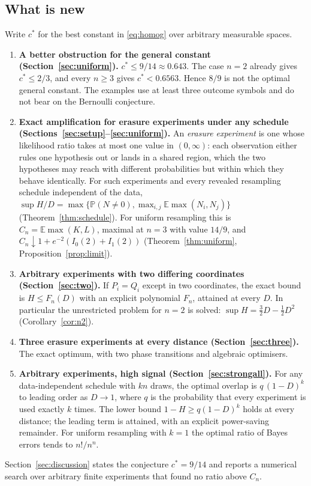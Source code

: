 \documentclass[11pt,a4paper]{article}
\theoremstyle{definition}\newtheorem{definition}[theorem]{Definition}
\theoremstyle{remark}\newtheorem{remark}[theorem]{Remark}
\newcommand{\E}{\mathbb E}
\newcommand{\PP}{\mathbb P}
\begin{document}
\subsection{What is new}
Write $c^*$ for the best constant in \eqref{eq:homog} over arbitrary measurable spaces.
\begin{enumerate}[leftmargin=*]
\item \textbf{A better obstruction for the general constant (Section~\ref{sec:uniform}).} $c^*\le 9/14\approx0.643$. The case $n=2$ already gives $c^*\le2/3$, and every $n\ge3$ gives $c^*<0.6563$. Hence $8/9$ is not the optimal general constant. The examples use at least three outcome symbols and do not bear on the Bernoulli conjecture.
\item \textbf{Exact amplification for erasure experiments under any schedule (Sections~\ref{sec:setup}--\ref{sec:uniform}).} An \emph{erasure experiment} is one whose likelihood ratio takes at most one value in $(0,\infty)$: each observation either rules one hypothesis out or lands in a shared region, which the two hypotheses may reach with different probabilities but within which they behave identically. For such experiments and every revealed resampling schedule independent of the data, $\sup H/D=\max\{\PP(N\ne0),\max_{i,j}\E\max(N_i,N_j)\}$ (Theorem~\ref{thm:schedule}). For uniform resampling this is $C_n=\E\max(K,L)$, maximal at $n=3$ with value $14/9$, and $C_n\downarrow 1+e^{-2}(I_0(2)+I_1(2))$ (Theorem~\ref{thm:uniform}, Proposition~\ref{prop:limit}).
\item \textbf{Arbitrary experiments with two differing coordinates (Section~\ref{sec:two}).} If $P_i=Q_i$ except in two coordinates, the exact bound is $H\le F_n(D)$ with an explicit polynomial $F_n$, attained at every $D$. In particular the unrestricted problem for $n=2$ is solved: $\sup H=\frac32D-\frac12D^2$ (Corollary~\ref{cor:n2}).
\item \textbf{Three erasure experiments at every distance (Section~\ref{sec:three}).} The exact optimum, with two phase transitions and algebraic optimisers.
\item \textbf{Arbitrary experiments, high signal (Section~\ref{sec:strongall}).} For any data-independent schedule with $kn$ draws, the optimal overlap is $q\,(1-D)^k$ to leading order as $D\to1$, where $q$ is the probability that every experiment is used exactly $k$ times. The lower bound $1-H\ge q(1-D)^k$ holds at every distance; the leading term is attained, with an explicit power-saving remainder. For uniform resampling with $k=1$ the optimal ratio of Bayes errors tends to $n!/n^n$.
\end{enumerate}
Section~\ref{sec:discussion} states the conjecture $c^*=9/14$ and reports a numerical search over arbitrary finite experiments that found no ratio above $C_n$.
\end{document}
